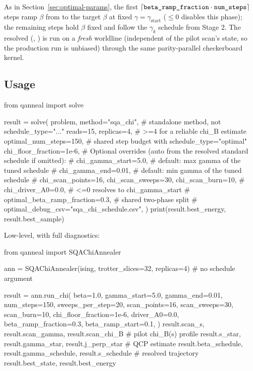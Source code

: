 As in Section~\ref{sec:optimal-params}, the first
$\lceil\code{beta\_ramp\_fraction}\cdot\code{num\_steps}\rceil$ steps ramp
$\beta$ from  to the target $\beta$ at fixed
$\gamma=\gamma_{\mathrm{start}}$ ($\le0$ disables
this phase); the remaining steps hold $\beta$ fixed and follow the
$\gamma_k$ schedule from Stage 2. The resolved
(, ) is run on a \emph{fresh}
worldline (independent of the pilot scan's state, so the production run is
unbiased) through the same parity-parallel checkerboard kernel.

\subsection{Usage}

\begin{pycode}
from qanneal import solve

result = solve(
    problem,
    method="sqa_chi",                  # standalone method, not schedule_type="..."
    reads=15,
    replicas=4,                        # >=4 for a reliable chi_B estimate
    optimal_num_steps=150,             # shared step budget with schedule_type="optimal"
    chi_floor_fraction=1e-6,
    # Optional overrides (auto from the resolved standard schedule if omitted):
    # chi_gamma_start=5.0,             # default: max gamma of the tuned schedule
    # chi_gamma_end=0.01,              # default: min gamma of the tuned schedule
    # chi_scan_points=16, chi_scan_sweeps=30, chi_scan_burn=10,
    # chi_driver_A0=0.0,               # <=0 resolves to chi_gamma_start
    # optimal_beta_ramp_fraction=0.3,  # shared two-phase split
    # optimal_debug_csv="sqa_chi_schedule.csv",
)
print(result.best_energy, result.best_sample)
\end{pycode}

Low-level, with full diagnostics:

\begin{pycode}
from qanneal import SQAChiAnnealer

ann = SQAChiAnnealer(ising, trotter_slices=32, replicas=4)   # no schedule argument

result = ann.run_chi(
    beta=1.0, gamma_start=5.0, gamma_end=0.01,
    num_steps=150, sweeps_per_step=20,
    scan_points=16, scan_sweeps=30, scan_burn=10,
    chi_floor_fraction=1e-6, driver_A0=0.0,
    beta_ramp_fraction=0.3, beta_ramp_start=0.1,
)
result.scan_s, result.scan_gamma, result.scan_chi_B     # pilot chi_B(s) profile
result.s_star, result.gamma_star, result.j_perp_star    # QCP estimate
result.beta_schedule, result.gamma_schedule, result.s_schedule  # resolved trajectory
result.best_state, result.best_energy
\end{pycode}

